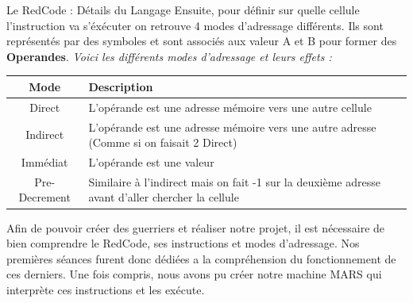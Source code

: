 \documentclass[a4paper, 10pt]{article}
\begin{document}
\begin{section}{Le RedCode : Détails du Langage}
        \bigskip
        Ensuite, pour définir sur quelle cellule l'instruction va s'éxécuter on retrouve 4 modes d'adressage différents. Ils sont représentés par des symboles et sont associés aux valeur A et B pour former des \textbf{Operandes}.
        \bigskip \newline
            \textit{Voici les différents modes d'adressage et leurs effets :}
        \bigskip

        \begin{tabular}{|c|p{8cm}|}
            \hline
                \textbf{Mode} & \textbf{Description} \\
            \hline
                Direct & L'opérande est une adresse mémoire vers une autre cellule \\
            \hline
                Indirect & L'opérande est une adresse mémoire vers une autre adresse (Comme si on faisait 2 Direct) \\
            \hline
                Immédiat & L'opérande est une valeur \\
            \hline
                Pre-Decrement & Similaire à l'indirect mais on fait -1 sur la deuxième adresse avant d'aller chercher la cellule \\
            \hline
        \end{tabular}

        \bigskip
        Afin de pouvoir créer des guerriers et réaliser notre projet, il est nécessaire de bien comprendre le RedCode, ses instructions et modes d'adressage. Nos premières séances furent donc dédiées a la compréhension du fonctionnement de ces derniers. Une fois compris, nous avons pu créer notre machine MARS qui interprète ces instructions et les exécute.
        \bigskip
    \end{section}
\end{document}
